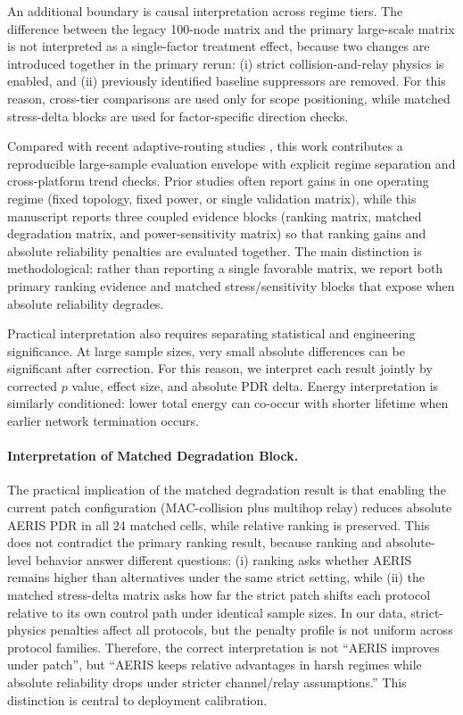 ﻿\documentclass[sensors,article,submit,moreauthors,pdftex]{Definitions/mdpi}
\begin{document}
An additional boundary is causal interpretation across regime tiers. The difference between the legacy 100-node matrix and the primary large-scale matrix is not interpreted as a single-factor treatment effect, because two changes are introduced together in the primary rerun: (i) strict collision-and-relay physics is enabled, and (ii) previously identified baseline suppressors are removed. For this reason, cross-tier comparisons are used only for scope positioning, while matched stress-delta blocks are used for factor-specific direction checks.

Compared with recent adaptive-routing studies \cite{Ren2024,Okine2024,Naeem2024DRL,Scientific2025DRLGNN,Kaddi2024GWOCSMA,Wang2024Geographic,Tariq2024A,Jain2025Optimized,Ti2026HEOCP,Manogaran2025DDQN}, this work contributes a reproducible large-sample evaluation envelope with explicit regime separation and cross-platform trend checks. Prior studies often report gains in one operating regime (fixed topology, fixed power, or single validation matrix), while this manuscript reports three coupled evidence blocks (ranking matrix, matched degradation matrix, and power-sensitivity matrix) so that ranking gains and absolute reliability penalties are evaluated together. The main distinction is methodological: rather than reporting a single favorable matrix, we report both primary ranking evidence and matched stress/sensitivity blocks that expose when absolute reliability degrades.

Practical interpretation also requires separating statistical and engineering significance. At large sample sizes, very small absolute differences can be significant after correction. For this reason, we interpret each result jointly by corrected $p$ value, effect size, and absolute PDR delta. Energy interpretation is similarly conditioned: lower total energy can co-occur with shorter lifetime when earlier network termination occurs.

\paragraph{Interpretation of Matched Degradation Block.}
The practical implication of the matched degradation result is that enabling the current patch configuration (MAC-collision plus multihop relay) reduces absolute AERIS PDR in all 24 matched cells, while relative ranking is preserved. This does not contradict the primary ranking result, because ranking and absolute-level behavior answer different questions: (i) ranking asks whether AERIS remains higher than alternatives under the same strict setting, while (ii) the matched stress-delta matrix asks how far the strict patch shifts each protocol relative to its own control path under identical sample sizes. In our data, strict-physics penalties affect all protocols, but the penalty profile is not uniform across protocol families. Therefore, the correct interpretation is not ``AERIS improves under patch'', but ``AERIS keeps relative advantages in harsh regimes while absolute reliability drops under stricter channel/relay assumptions.'' This distinction is central to deployment calibration.
\end{document}
